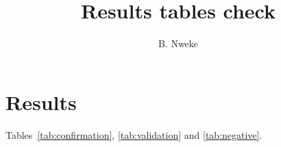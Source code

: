 \documentclass[a4paper,fleqn]{cas-dc}
\begin{document}
\let\printorcid\relax
\title [mode = title]{Results tables check}
\author[1]{B. Nweke}
\maketitle
\section{Results}
Tables~\ref{tab:confirmation}, \ref{tab:validation} and \ref{tab:negative}.



\end{document}

